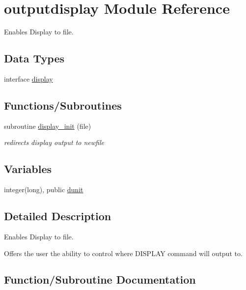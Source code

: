 \hypertarget{namespaceoutputdisplay}{}\section{outputdisplay Module Reference}
\label{namespaceoutputdisplay}


Enables Display to file.  


\subsection*{Data Types}
\begin{DoxyCompactItemize}
\item 
interface \hyperlink{interfaceoutputdisplay_1_1display}{display}
\end{DoxyCompactItemize}
\subsection*{Functions/\+Subroutines}
\begin{DoxyCompactItemize}
\item 
subroutine \hyperlink{namespaceoutputdisplay_a9a8a15080a89f2947af09f8fb326a2e0}{display\+\_\+init} (file)
\begin{DoxyCompactList}\small\item\em redirects display output to newfile \end{DoxyCompactList}\end{DoxyCompactItemize}
\subsection*{Variables}
\begin{DoxyCompactItemize}
\item 
integer(long), public \hyperlink{namespaceoutputdisplay_a37a1610ae7e198bc24d119cea584a6f2}{dunit}
\end{DoxyCompactItemize}


\subsection{Detailed Description}
Enables Display to file. 

Offers the user the ability to control where D\+I\+S\+P\+L\+AY command will output to. 

\subsection{Function/\+Subroutine Documentation}
\mbox{\label{namespaceoutputdisplay_a9a8a15080a89f2947af09f8fb326a2e0}} 
